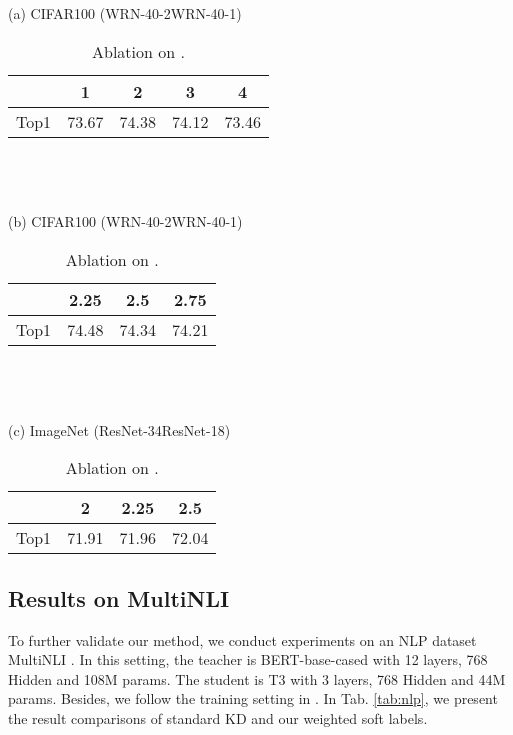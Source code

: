 \documentclass{article} \usepackage{iclr2021_conference,times}
\newcommand\revise[1]{#1}
\begin{document}
\begin{table}
\caption{Ablation on .}\label{tab:alpha}
\begin{center}
(a) CIFAR100 (WRN-40-2WRN-40-1)\\
\begin{tabular}{ccccc}
\toprule
&1&2&3&4\\ \midrule
Top1&73.67&74.38&74.12&73.46\\\bottomrule
\end{tabular}\\ ~\\ ~\\
(b) CIFAR100 (WRN-40-2WRN-40-1)\\
\begin{tabular}{cccc}
\toprule
&2.25&2.5&2.75\\ \midrule
Top1&74.48&74.34&74.21\\\bottomrule
\end{tabular}\\ ~\\ ~\\
(c) ImageNet (ResNet-34ResNet-18)\\
\begin{tabular}{cccc}
\toprule
&2&2.25&2.5\\ \midrule
Top1&71.91&71.96&72.04\\\bottomrule
\end{tabular}
\end{center}
\end{table}

\begin{table}
\caption{Results on MultiNLI.}\label{tab:nlp}
\end{table}


\revise{
\subsection{Results on MultiNLI}
To further validate our method, we conduct experiments on an NLP dataset MultiNLI \citep{N18}. In this setting, the teacher is BERT-base-cased with 12 layers, 768 Hidden and 108M params. The student is T3 with 3 layers, 768 Hidden and 44M params. Besides, we follow the training setting in \citet{sun2019patient}. In Tab. \ref{tab:nlp}, we present the result comparisons of standard KD and our weighted soft labels. 
}
\end{document}

